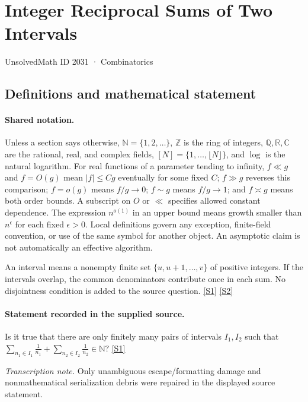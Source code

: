 \documentclass[11pt,a4paper]{article}
\newcommand{\N}{\mathbb{N}}
\newcommand{\Z}{\mathbb{Z}}
\newcommand{\Q}{\mathbb{Q}}
\newcommand{\R}{\mathbb{R}}
\newcommand{\C}{\mathbb{C}}
\newcommand{\sref}[2]{\hyperlink{source:#1:#2}{[S#2]}}
\begin{document}

\setcounter{section}{2030}

\section{Integer Reciprocal Sums of Two Intervals}\label{2031}

{\small\sffamily UnsolvedMath ID 2031 · Combinatorics}

\subsection{Definitions and mathematical statement}

\paragraph{Shared notation.}Unless a section says otherwise, $\N=\{1,2,\ldots\}$,
$\Z$ is the ring of integers, $\Q,\R,\C$ are the rational, real, and complex
fields, $[N]=\{1,\ldots,\lfloor N\rfloor\}$, and $\log$ is the natural
logarithm. For real functions of a parameter tending to infinity,
$f\ll g$ and $f=O(g)$ mean $|f|\leq Cg$ eventually for some fixed $C$;
$f\gg g$ reverses this comparison; $f=o(g)$ means $f/g\to0$;
$f\sim g$ means $f/g\to1$; and $f\asymp g$ means both order bounds.
A subscript on $O$ or $\ll$ specifies allowed constant dependence.
The expression $n^{o(1)}$ in an upper bound means growth smaller than
$n^\epsilon$ for each fixed $\epsilon>0$. Local definitions govern any
exception, finite-field convention, or use of the same symbol for another
object. An asymptotic claim is not automatically an effective algorithm.



An interval means a nonempty finite set $\{u,u+1,\ldots,v\}$ of positive integers. If the intervals overlap, the common denominators contribute once in each sum. No disjointness condition is added to the source question. \sref{2031}{1} \sref{2031}{2}

\paragraph{Statement recorded in the supplied source.}
Is it true that there are only finitely many pairs of intervals $I_1,I_2$ such that $ \sum_{n_1\in I_1}\frac{1}{n_1}+\sum_{n_2\in I_2}\frac{1}{n_2}\in \mathbb{N}? $ \sref{2031}{1}

{\small\emph{Transcription note.} Only unambiguous escape/formatting damage and nonmathematical serialization debris were repaired in the displayed source statement.}
\end{document}
